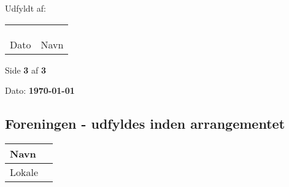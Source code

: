 \documentclass[a4paper, 11pt]{article}
\begin{document}
{{{{{{\vfill

\noindent
Udfyldt af:\\
\begin{tabular}{ll}
    & \\
    & \\
    & \\
    \hline
    Dato \hspace{3cm} & Navn \hspace{3cm}
\end{tabular}

\vfill

\begin{center}
    Side \textbf{3} af \textbf{3}
\end{center}

{%
{%
{%
{%
{%

{%

\noindent
\small{Dato: \textbf{\today} }

\subsection*{Foreningen - udfyldes inden arrangementet}

\begin{tabular}{|l|l|}
    \hline
    \begin{minipage}[t]{0.475\textwidth}
        Navn
        \newline
    \end{minipage} &
    \begin{minipage}[t]{0.475\textwidth}

    \end{minipage} \\
    \hline
    \begin{minipage}[t]{0.475\textwidth}
        Lokale
        \newline
    \end{minipage} &
    \begin{minipage}[t]{0.475\textwidth}


\end{minipage}
\end{tabular}}}}}}}}}}}}}
\end{document}
